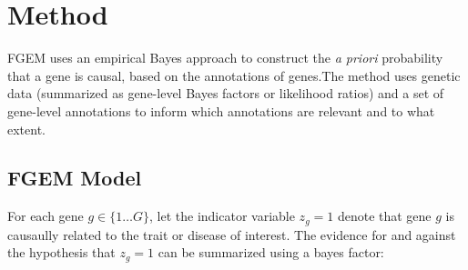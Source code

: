 
\section{Method}\label{sec:org4822ac5}

FGEM uses an empirical Bayes approach to construct the \emph{a priori} probability that a gene is causal, based on the annotations of genes.The method uses genetic data (summarized as gene-level Bayes factors or likelihood ratios) and a set of gene-level annotations to inform which annotations are relevant and to what extent.
\subsection{FGEM Model}\label{sec:org4e93496}

For each gene  \(g \in \{1 \dots G\}\), let the indicator variable \(z_g=1\) denote that gene \(g\) is causaully related to the trait or disease of interest.  The evidence for and against the hypothesis that \(z_g=1\) can be
summarized using a bayes factor:

